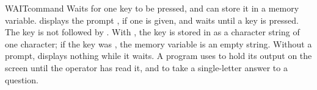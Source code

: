 \begin{XbaseEntry}{WAIT}{command}
Waits for one key to be pressed, and can store it in a memory variable.
\Syntax
{}
\Usage
{} displays the prompt , if one is given, and waits until a key
is pressed.  The key is not followed by .  With , the key is
stored in  as a character string of one character; if the key was
, the memory variable is an empty string.  Without a prompt,
 displays nothing while it waits.
\Tips
A program uses  to hold its output on the screen until the operator
has read it, and to take a single-letter answer to a question.
\Examples
{}
\end{XbaseEntry}

